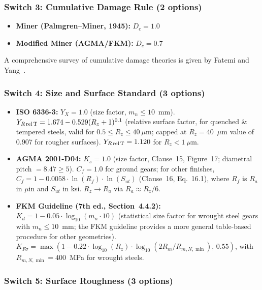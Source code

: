 \documentclass[12pt,a4paper]{article}
\begin{document}
\subsubsection{Switch 3: Cumulative Damage Rule (2 options)}

\begin{itemize}
  \item \textbf{Miner (Palmgren--Miner, 1945):} $D_c = 1.0$
  \item \textbf{Modified Miner (AGMA/FKM):} $D_c = 0.7$
\end{itemize}
A comprehensive survey of cumulative damage theories is given by Fatemi and Yang~\cite{fatemi1998}.

\subsubsection{Switch 4: Size and Surface Standard (3 options)}

\begin{itemize}
  \item \textbf{ISO 6336-3:} $Y_X = 1.0$ (size factor, $m_n \leq 10$~mm).
        $Y_{R\,\rm rel\,T} = 1.674 - 0.529(R_z+1)^{0.1}$ (relative
        surface factor, for quenched \& tempered steels, valid for
        $0.5 \leq R_z \leq 40~\mu$m; capped at $R_z=40$~$\mu$m value
        of 0.907 for rougher surfaces). $Y_{R\,\rm rel\,T} = 1.120$
        for $R_z < 1~\mu$m.
  \item \textbf{AGMA 2001-D04:} $K_s = 1.0$ (size factor, Clause~15,
        Figure~17; diametral pitch $=8.47 \geq 5$).
        $C_f = 1.0$ for ground gears; for other finishes,
        $C_f = 1 - 0.0058 \cdot \ln(R_f) \cdot \ln(S_{ut})$
        (Clause~16, Eq.~16.1), where $R_f$ is $R_a$ in $\mu$in
        and $S_{ut}$ in ksi. $R_z \rightarrow R_a$ via
        $R_a \approx R_z/6$.
  \item \textbf{FKM Guideline (7th ed., Section~4.4.2):}
        $K_d = 1 - 0.05 \cdot \log_{10}(m_n \cdot 10)$ (statistical size
        factor for wrought steel gears with $m_n \leq 10$~mm;
        the FKM guideline provides a more general table-based procedure
        for other geometries).
        $K_{F\sigma} = \max(1 - 0.22 \cdot \log_{10}(R_z) \cdot
        \log_{10}(2R_m/R_{m,N,\min}),\, 0.55)$, with
        $R_{m,N,\min}=400$~MPa for wrought steels.
\end{itemize}

\subsubsection{Switch 5: Surface Roughness (3 options)}
\end{document}
